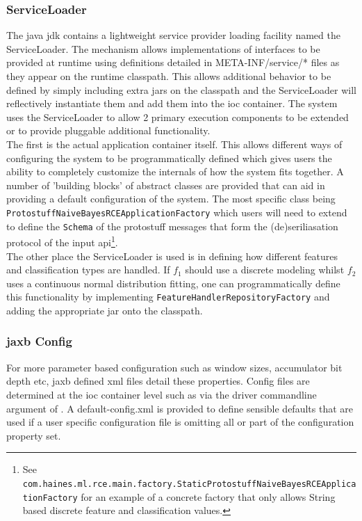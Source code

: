 \documentclass[a4paper,11pt]{scrreprt}
\begin{document}
\subsubsection{ServiceLoader}
The java \acrshort{jdk} contains a lightweight service provider loading facility named the ServiceLoader. The mechanism allows implementations of interfaces to be provided at runtime using definitions detailed in META-INF/service/* files as they appear on the runtime classpath. This allows additional behavior to be defined by simply including extra jars on the classpath and the ServiceLoader will reflectively instantiate them and add them into the \acrshort{ioc} container. The system uses the ServiceLoader to allow 2 primary execution components to be extended or to provide pluggable additional functionality.\\
The first is the actual application container itself. This allows different ways of configuring the system to be programmatically defined which gives users the ability to completely customize the internals of how the system fits together. A number of 'building blocks' of abstract classes are provided that can aid in providing a default configuration of the system. The most specific class being\\ \verb|ProtostuffNaiveBayesRCEApplicationFactory| which users will need to extend to define the \verb|Schema| of the protostuff messages that form the (de)seriliasation protocol of the input \acrshort{api}\footnote{See \verb|com.haines.ml.rce.main.factory.StaticProtostuffNaiveBayesRCEApplicationFactory| for an example of a concrete factory that only allows String based discrete feature and classification values.}.\\

The other place the ServiceLoader is used is in defining how different features and classification types are handled. If \(f_1\) should use a discrete modeling whilst \(f_2\) uses a continuous normal distribution fitting, one can programmatically define this functionality by implementing \verb|FeatureHandlerRepositoryFactory| and adding the appropriate jar onto the classpath. 

\subsubsection{\acrshort{jaxb} Config}
For more parameter based configuration such as window sizes, accumulator bit depth etc, \acrshort{jaxb} defined \acrshort{xml} files detail these properties. Config files are determined at the \acrshort{ioc} container level such as via the driver commandline argument of . A default-config.xml is provided to define sensible defaults that are used if a user specific configuration file is omitting all or part of the configuration property set.
\end{document}
